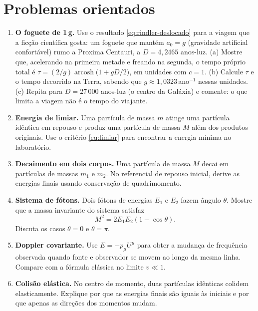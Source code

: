\documentclass[12pt,a4paper,oneside]{book}
\theoremstyle{rgplain}
\theoremstyle{rgremark}
\begin{document}
\section{Problemas orientados}

\begin{enumerate}
  \item \label{item-aceleracao-propria} \textbf{O foguete de 1\,g.} Use o
  resultado \eqref{eq:rindler-deslocado} para a viagem que a ficção científica
  gosta: um foguete que mantém $a_0=g$ (gravidade artificial confortável) rumo
  a Proxima Centauri, a $D=4{,}2465$ anos-luz. (a) Mostre que, acelerando na primeira metade
  e freando na segunda, o tempo próprio total é
  $\tau=(2/g)\operatorname{arcosh}\!\big(1+gD/2\big)$, em unidades com
  $c=1$. (b) Calcule $\tau$ e o tempo decorrido na Terra, sabendo que
  $g\approx1{,}0323$\,ano$^{-1}$ nessas unidades. (c) Repita para
  $D=27\,000$ anos-luz (o centro da Galáxia) e comente: o que limita a
  viagem não é o tempo do viajante.

  \item \label{item-energia-limiar} \textbf{Energia de limiar.} Uma partícula
  de massa $m$ atinge uma partícula idêntica em repouso e produz uma
  partícula de massa $M$ além dos produtos originais. Use o critério
  \eqref{eq:limiar} para encontrar a energia mínima no laboratório.

  \item \textbf{Decaimento em dois corpos.} Uma partícula de massa $M$ decai em
  partículas de massas $m_1$ e $m_2$. No referencial de repouso inicial, derive
  as energias finais usando conservação de quadrimomento.

  \item \label{item-sistema-fotons} \textbf{Sistema de fótons.} Dois fótons de
  energias $E_1$ e $E_2$ fazem ângulo $\theta$. Mostre que a massa invariante
  do sistema satisfaz
  \[
    M^2=2E_1E_2(1-\cos\theta).
  \]
  Discuta os casos $\theta=0$ e $\theta=\pi$.

  \item \label{item-doppler} \textbf{Doppler covariante.} Use $E=-p_\mu U^\mu$ para obter a mudança
  de frequência observada quando fonte e observador se movem ao longo da mesma
  linha. Compare com a fórmula clássica no limite $v\ll1$.

  \item \textbf{Colisão elástica.} No centro de momento, duas partículas
  idênticas colidem elasticamente. Explique por que as energias finais são
  iguais às iniciais e por que apenas as direções dos momentos mudam.
\end{enumerate}
\end{document}

